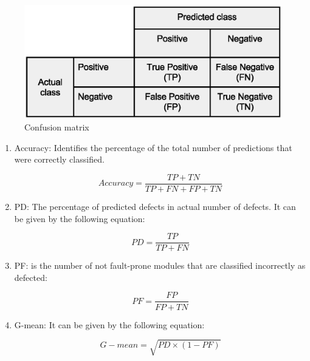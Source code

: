\documentclass[runningheads,a4paper]{llncs}
\begin{document}
\begin{figure}[h]
\label{fig:ss}
\begin{center}
\includegraphics[scale=0.5]{confusion-matrix.eps}
\caption{Confusion matrix}
\end{center}
\label{fig:confusion}
\end{figure}


\begin{enumerate}



\item Accuracy: Identifies the percentage of the total number of predictions that were correctly classified.

\begin{equation}
Accuracy=\frac{TP+TN}{TP + FN + FP + TN}
\label{accuracy}
\end{equation}

\item PD: The percentage of predicted defects in actual number of defects. It can be given by the following equation:

\begin{equation}
PD=\frac{TP}{TP+FN}
\end{equation}

\item PF: is the number of not fault-prone modules that are classified incorrectly as defected:

\begin{equation}
PF=\frac{FP}{FP+TN}
\end{equation}

\item G-mean: It can be given by the following equation:

\begin{equation}
G-mean=\sqrt{PD \times (1-PF)}
\end{equation}




\end{enumerate}
\end{document}
